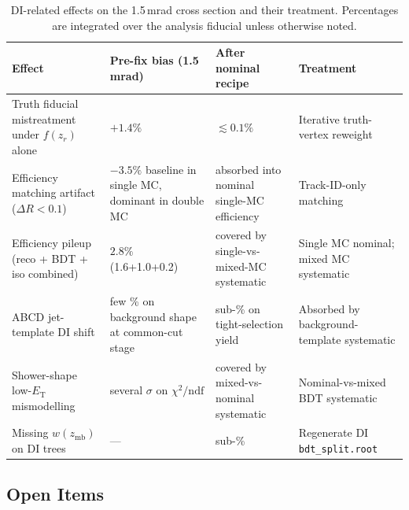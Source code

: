 \documentclass[11pt,a4paper]{article}
\newcommand{\ET}{\ensuremath{E_{\text{T}}}\xspace}
\newcommand{\chidf}{\ensuremath{\chi^2/\mathrm{ndf}}\xspace}
\newcommand{\DR}{\ensuremath{\Delta R}\xspace}
\begin{document}
\begin{table}[H]
\centering
\caption{DI-related effects on the 1.5\,mrad cross section and
  their treatment. Percentages are integrated over the analysis
  fiducial unless otherwise noted.}
\label{tab:xsec_summary}
\small
\begin{tabular}{p{4.5cm}p{3.5cm}p{3cm}p{3cm}}
\toprule
Effect & Pre-fix bias (1.5\,mrad) & After nominal recipe & Treatment \\
\midrule
Truth fiducial mistreatment under $f(z_r)$ alone & $+1.4\%$ & $\lesssim 0.1\%$ & Iterative truth-vertex reweight \\
Efficiency matching artifact ($\DR<0.1$) & $-3.5\%$ baseline in single MC, dominant in double MC &  absorbed into nominal single-MC efficiency & Track-ID-only matching \\
Efficiency pileup (reco + BDT + iso combined) & $2.8\%$ (1.6+1.0+0.2) & covered by single-vs-mixed-MC systematic & Single MC nominal; mixed MC systematic \\
ABCD jet-template DI shift & few \% on background shape at common-cut stage & sub-\% on tight-selection yield & Absorbed by background-template systematic \\
Shower-shape low-\ET mismodelling & several $\sigma$ on \chidf & covered by mixed-vs-nominal systematic & Nominal-vs-mixed BDT systematic \\
Missing $w(z_\mathrm{mb})$ on DI trees & --- & sub-\% & Regenerate DI \texttt{bdt\_split.root} \\
\bottomrule
\end{tabular}
\end{table}

\subsection{Open Items}
\end{document}

